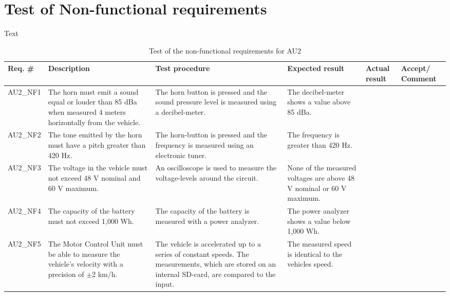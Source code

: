 \section{Test of Non-functional requirements}
Text

\begin{table}[h!]
	\centering
	\label{my-label}
	\begin{tabular}{|p{1.6 cm}|p{2.9 cm}|p{2.1 cm}|p{2.1 cm}|p{2.1 cm}|p{1.9 cm}|}
		\hline
		\textbf{Req. \#} & \textbf{Description} & \textbf{Test procedure} & 
		\textbf{Expected result} & \textbf{Actual result} & \textbf{Accept/ Comment} \\ \hline
		AU2\_NF1 
		& The horn must emit a sound equal or louder than 85 dBa when measured 4 meters horizontally from the vehicle.
		& The horn button is pressed and the sound pressure level is measured using a decibel-meter.
		& The decibel-meter shows a value above 85 dBa.
		& 
		& \\ \hline
		AU2\_NF2
		& The tone emitted by the horn must have a pitch greater than 420 Hz.
		& The horn-button is pressed and the frequency is measured using an electronic tuner.
		& The frequency is greater than 420 Hz.
		& 
		& \\ \hline
		AU2\_NF3
		& The voltage in the vehicle must not exceed 48 V nominal and 60 V maximum.
		& An oscilloscope is used to measure the voltage-levels around the circuit.
		& None of the measured voltages are above 48 V nominal or 60 V maximum.
		& 
		& \\ \hline
		AU2\_NF4
		& The capacity of the battery must not exceed 1,000 Wh.
		& The capacity of the battery is measured with a power analyzer.
		& The power analyzer shows a value below 1,000 Wh.
		& 
		& \\ \hline
		AU2\_NF5
		& The Motor Control Unit must be able to measure the vehicle's velocity with a precision of $\pm$2 km/h.
		& The vehicle is accelerated up to a series of constant speeds. The measurements, which are stored on an internal SD-card, are compared to the input.
		& The measured speed is identical to the vehicles speed.
		& 
		& \\ \hline			
	\end{tabular}
	\caption{Test of the non-functional requirements for AU2}
\end{table}